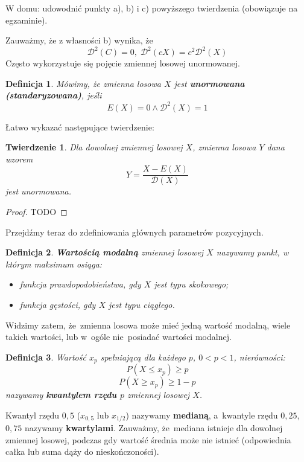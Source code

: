 \documentclass[10pt,a4paper]{article}
\newtheorem{definition}{Definicja}[section]
\newtheorem{theorem}{Twierdzenie}[section]
\numberwithin{equation}{subsection}
\begin{document}
W domu: udowodnić punkty a), b) i c) powyższego twierdzenia (obowiązuje na
egzaminie).

Zauważmy, że z własności b) wynika, że
\[
  \mathscr{D}^2(C) = 0,\;\mathscr{D}^2(cX) = c^2\mathscr{D}^2(X)
\]
Często wykorzystuje się pojęcie zmiennej losowej unormowanej.

\begin{definition}
  Mówimy, że zmienna losowa $X$ jest \textbf{unormowana (standaryzowana)}, jeśli
  \[
    E(X) = 0 \land \mathscr{D}^2(X)=1
  \]
\end{definition}

Łatwo wykazać następujące twierdzenie:

\begin{theorem}
  Dla dowolnej zmiennej losowej $X$, zmienna losowa $Y$ dana wzorem
  \[
    Y = \frac{X-E(X)}{\mathscr{D}(X)}
  \]
  jest unormowana.
\end{theorem}
\begin{proof}
  TODO
\end{proof}

Przejdźmy teraz do zdefiniowania głównych parametrów pozycyjnych.

\begin{definition}
  \textbf{Wartością modalną} zmiennej losowej $X$ nazywamy punkt, w którym maksimum osiąga:
  \begin{itemize}
    \item funkcja prawdopodobieństwa, gdy $X$ jest typu skokowego;
    \item funkcja gęstości, gdy $X$ jest typu ciągłego.
  \end{itemize}
\end{definition}

Widzimy zatem, że~zmienna losowa może mieć jedną wartość modalną, wiele takich
wartości, lub w~ogóle nie~posiadać wartości modalnej.

\begin{definition}
  Wartość $x_p$ spełniającą dla każdego $p$, $0<p<1$, nierówności:
  \[
    P(X\leq x_p)\geq p
  \]
  \[
    P(X\geq x_p)\geq 1-p
  \]
  nazywamy \textbf{kwantylem rzędu $p$} zmiennej losowej $X$.
\end{definition}

Kwantyl rzędu $0,5$ ($x_{0,5}$ lub $x_{1/2}$) nazywamy \textbf{medianą},
a~kwantyle rzędu $0,25$, $0,75$ nazywamy \textbf{kwartylami}. Zauważmy,
że~mediana istnieje dla dowolnej zmiennej losowej, podczas gdy wartość średnia
może nie istnieć (odpowiednia całka lub suma dąży do nieskończoności).
\end{document}
